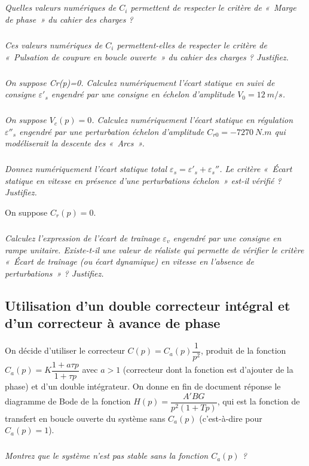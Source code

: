 \documentclass[10pt,fleqn]{article} %
\begin{document}
\begin{multicols}{2}
\subparagraph{}
\textit{Quelles valeurs numériques de $C_i$ permettent de respecter le critère de «~Marge de phase~» du cahier des charges ?}

\subparagraph{}
\textit{Ces valeurs numériques de $C_i$ permettent-elles de respecter le critère de «~Pulsation de coupure en boucle ouverte~» du cahier des charges ? Justifiez.}

\subparagraph{}
\textit{On suppose Cr(p)=0. Calculez numériquement l’écart statique en suivi de consigne $\varepsilon'_s$ engendré par une consigne en échelon d’amplitude $V_0=\SI{12}{m/s}$.}

\subparagraph{}
\textit{On suppose $V_c(p)=0$. Calculez numériquement l’écart statique en régulation $\varepsilon''_s$ engendré par une perturbation échelon d’amplitude $C_{r0}=\SI{-7270}{N.m}$ qui modéliserait la descente des «~Arcs~».}

\subparagraph{}
\textit{Donnez numériquement l’écart statique total $\varepsilon_s=\varepsilon'_s+ \varepsilon_s''$. Le critère «~Écart statique en vitesse en présence d’une perturbations échelon~» est-il vérifié ? Justifiez.}

\vspace{.5cm}

On suppose $C_r(p)=0$.
\subparagraph{}
\textit{Calculez l’expression de l’écart de traînage $\varepsilon_v$ engendré par une consigne en rampe unitaire. Existe-t-il une valeur de   réaliste qui permette de vérifier le critère «~Écart de traînage (ou écart dynamique) en vitesse en l’absence de perturbations~» ? Justifiez.}

\subsection*{Utilisation d’un double correcteur intégral et d’un correcteur à avance de phase}


On décide d’utiliser le correcteur $C(p)=C_a(p)\dfrac{1}{p^2}$, produit de la fonction $C_a(p)=K\dfrac{1+a\tau p}{1+\tau p}$  avec $a>1$ (correcteur dont la fonction est d’ajouter de la phase) et d’un double intégrateur.
	On donne en fin de document réponse le diagramme de Bode de la fonction $H(p)=\dfrac{A'BG}{p^2\left(1+T p\right)}$, qui est la fonction de transfert en boucle ouverte du système sans $C_a(p)$   (c’est-à-dire pour $C_a(p)=1$).



\subparagraph{}
\textit{Montrez que le système n’est pas stable sans la fonction  $C_a(p)$ ?}


\end{multicols}
\end{document}
